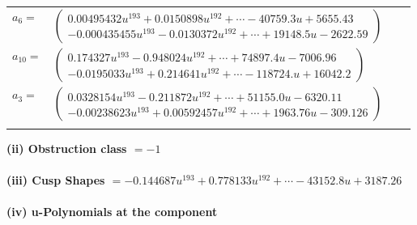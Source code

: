 \documentclass[1p]{elsarticle_modified}
\theoremstyle{definition}
\begin{document}
\begin{tabular}{m{7pt} m{180pt} m{7pt} m{180pt} }
\flushright $a_{6}=$&$\begin{pmatrix}0.00495432 u^{193}+0.0150898 u^{192}+\cdots-40759.3 u+5655.43\\-0.000435455 u^{193}-0.0130372 u^{192}+\cdots+19148.5 u-2622.59\end{pmatrix}$ \\
\flushright $a_{10}=$&$\begin{pmatrix}0.174327 u^{193}-0.948024 u^{192}+\cdots+74897.4 u-7006.96\\-0.0195033 u^{193}+0.214641 u^{192}+\cdots-118724. u+16042.2\end{pmatrix}$ \\
\flushright $a_{3}=$&$\begin{pmatrix}0.0328154 u^{193}-0.211872 u^{192}+\cdots+51155.0 u-6320.11\\-0.00238623 u^{193}+0.00592457 u^{192}+\cdots+1963.76 u-309.126\end{pmatrix}$\\&\end{tabular}
\flushleft \textbf{(ii) Obstruction class $= -1$}\\~\\
\flushleft \textbf{(iii) Cusp Shapes $= -0.144687 u^{193}+0.778133 u^{192}+\cdots-43152.8 u+3187.26$}\\~\\
\newpage\renewcommand{\arraystretch}{1}
\flushleft \textbf{(iv) u-Polynomials at the component}\newline \\
\end{document}
